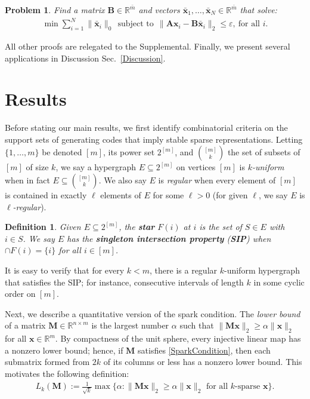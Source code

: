 \documentclass[9pt,twocolumn]{pnas-new}
\newtheorem{problem}{Problem}
\newtheorem{definition}{Definition}
\begin{document}
\begin{problem}\label{OptimizationProblem}
Find a matrix $\mathbf{B} \in \mathbb{R}^{\bar m}$ and vectors \mbox{$\mathbf{\bar x}_1, \ldots, \mathbf{\bar x}_N \in \mathbb{R}^{\bar m}$} that solve:
\begin{align}\label{minsum}
\min \sum_{i = 1}^N \|\mathbf{\bar x}_i\|_0 \ \ 
\text{subject to} \ \ \|\mathbf{A}\mathbf{x}_i - \mathbf{B}\mathbf{\bar x}_i\|_2 \leq \varepsilon, \ \text{for all $i$}.
\end{align}
\end{problem}

All other proofs are relegated to the Supplemental. 
Finally, we present several applications in Discussion Sec.~\ref{Discussion}. 

\section{Results}\label{Results}

Before stating our main results, we first identify combinatorial criteria on the support sets of generating codes that imply stable sparse representations.  Letting $\{1, \ldots, m\}$ be denoted $[m]$, its power set $2^{[m]}$, and ${[m] \choose k}$ the set of subsets of $[m]$ of size $k$,
we say a hypergraph $E \subseteq 2^{[m]}$ on vertices $[m]$ is \textit{$k$-uniform} when in fact $E \subseteq {[m] \choose k}$. We also say $E$ is \emph{regular} when every element of $[m]$ is contained in exactly $\ell$ elements of $E$ for some $\ell > 0$ (for given $\ell$, we say $E$ is \textit{$\ell$-regular}).

\begin{definition}\label{sip}
Given $E \subseteq 2^{[m]}$, the \textbf{star} $F(i)$ at $i$ is the set of $S \in E$ with $i \in S$. We say $E$ has the \textbf{singleton intersection property} (\textbf{SIP}) when $\cap F(i) = \{i\}$ for all $i \in [m]$. 
\end{definition}

It is easy to verify that for every $k < m$, there is a regular $k$-uniform hypergraph that satisfies the SIP; for instance, consecutive intervals of length $k$ in some cyclic order on $[m]$.

Next, we describe a quantitative version of the spark condition.  
The \emph{lower bound} \cite{Grcar10} of a matrix $\mathbf{M} \in \mathbb R^{n \times m}$ is the largest number $\alpha$ such that \mbox{$\|\mathbf{M}\mathbf{x}\|_2 \geq \alpha\|\mathbf{x}\|_2$} for all $\mathbf{x} \in \mathbb{R}^m$. By compactness of the unit sphere, every injective linear map has a nonzero lower bound; hence, if $\mathbf{M}$ satisfies \eqref{SparkCondition}, then each submatrix formed from $2k$ of its columns or less has a nonzero lower bound. This motivates the following definition: 
\begin{align*}
L_k(\mathbf{M}) := \frac{1}{\sqrt{k}}\max \{ \alpha : \|\mathbf{M}\mathbf{x}\|_2 \geq \alpha\|\mathbf{x}\|_2 \text{ for all $k$-sparse } \mathbf{x}\}.
\end{align*} 
\end{document}
